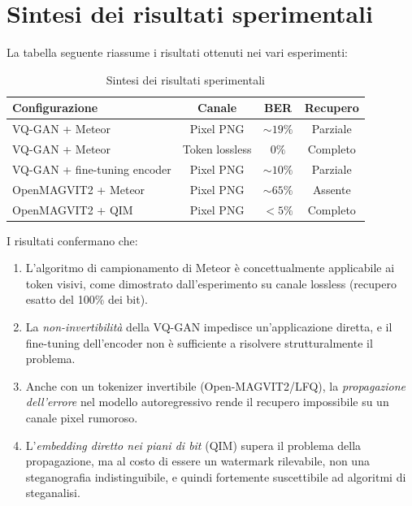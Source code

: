 \section{Sintesi dei risultati sperimentali}

La tabella seguente riassume i risultati ottenuti nei vari esperimenti:

\begin{table}[htbp]
	\centering
	\footnotesize
	\label{tab:risultati}
	\begin{tabular}{lccc}
		\toprule
		\textbf{Configurazione}      & \textbf{Canale} & \textbf{BER} & \textbf{Recupero} \\
		\midrule
		VQ-GAN + Meteor              & Pixel PNG       & $\sim 19\%$  & Parziale          \\
		VQ-GAN + Meteor              & Token lossless  & $0\%$        & Completo          \\
		VQ-GAN + fine-tuning encoder & Pixel PNG       & $\sim 10\%$  & Parziale          \\
		OpenMAGVIT2 + Meteor         & Pixel PNG       & $\sim 65\%$  & Assente           \\
		OpenMAGVIT2 + QIM            & Pixel PNG       & $< 5\%$      & Completo          \\
		\bottomrule
	\end{tabular}
	\caption{Sintesi dei risultati sperimentali}
\end{table}

I risultati confermano che:

\begin{enumerate}
	\item L'algoritmo di campionamento di Meteor è concettualmente applicabile ai token visivi, come dimostrato dall'esperimento su canale lossless (recupero esatto del 100\% dei bit).
	\item La \emph{non-invertibilità} della VQ-GAN impedisce un'applicazione diretta, e il fine-tuning dell'encoder non è sufficiente a risolvere strutturalmente il problema.
	\item Anche con un tokenizer invertibile (Open-MAGVIT2/LFQ), la \emph{propagazione dell'errore} nel modello autoregressivo rende il recupero impossibile su un canale pixel rumoroso.
	\item L'\emph{embedding diretto nei piani di bit} (QIM) supera il problema della propagazione, ma al costo di essere un watermark rilevabile, non una steganografia indistinguibile, e quindi fortemente suscettibile ad algoritmi di steganalisi.
\end{enumerate}

